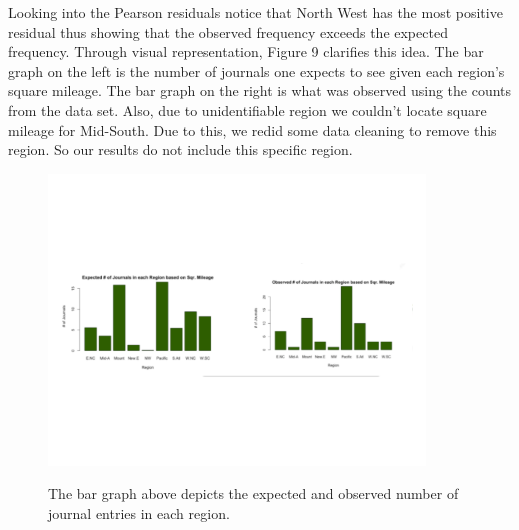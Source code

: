 \documentclass[12pt, letterpaper]{article}
\begin{document}
Looking into the Pearson residuals notice that North West has the most positive residual thus showing that the observed frequency exceeds the expected frequency. Through visual representation, Figure 9 clarifies this idea. The bar graph on the left is the number of journals one expects to see given each region's square mileage. The bar graph on the right is what was observed using the counts from the data set. Also, due to unidentifiable region we couldn't locate square mileage for Mid-South. Due to this, we redid some data cleaning to remove this region. So our results do not include this specific region.
\begin{figure}[!h]
\begin{center}
\includegraphics[width=10cm]{Regions2BarGraph.pdf}
\label{fig: Continent Bar Graph}
\caption{The bar graph above depicts the expected and observed number of journal entries in each region.}
\end{center}
\end{figure}
\end{document}
